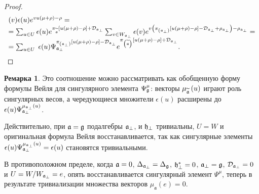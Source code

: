 \documentclass[12pt]{article}
\theoremstyle{definition}
\newtheorem{remark}{Ремарка}
\newcommand{\af}{\mathfrak{a}}
\newcommand{\aft}{\widetilde{\mathfrak{a}}}
\begin{document}
\begin{proof}
\begin{equation}
\begin{array}{l}
(v)\epsilon (u)e^{vu(\mu +\rho )-\rho }= \\
=\sum_{u\in U}\epsilon (u)e^{\pi _{\aft}\left[ u(\mu +\rho )-\rho \right]
+\mathcal{D}_{\frak{a}_{\perp }}}\sum_{v\in W_{\frak{a}_{\perp }}}\epsilon
(v)e^{v\left( \pi _{\left( \frak{a}_{\perp }\right) }\left[
u(\mu +\rho )-\rho \right] -\mathcal{D}_{\frak{a}_{\perp }}+\rho _{\frak{a}%
_{\perp }}\right) -\rho _{\frak{a}_{\perp }}}= \\
=\sum_{u\in U}\;\epsilon (u)\Psi _{\af_{\perp }}^{\pi
_{\left( \frak{a}_{\perp }\right) }\left[ u(\mu +\rho )-\rho
\right] -\mathcal{D}_{\frak{a}_{\perp }}}e^{\pi _{\left( \aft\right) }%
\left[ u(\mu +\rho )-\rho \right] +\mathcal{D}_{\frak{a}_{\perp }}}.
\end{array}
\label{singular main}
\end{equation}
\end{proof}

\bigskip

\begin{remark}
Это соотношение можно рассматривать как обобщенную форму формулы Вейля для сингулярного элемента $\Psi _{\frak{g}}^{\mu }$: векторы $\mu _{%
\widetilde{\mathfrak{a}}}\left( u\right) $ играют роль сингулярных весов, а чередующиеся множители  $\epsilon (u)$ расширены до $\epsilon
(u)\Psi _{\frak{a}_{\perp }}^{\mu _{\frak{a}_{\perp }}\left( u\right) }$.

Действительно, при  $\frak{a=g}$ подалгебры  $\frak{a}_{\perp }$, и $\frak{h}_{\perp }$ тривиальны, $U=W$ и оригинальная формула Вейля восстанавливается, так как сингулярные элементы $\epsilon (u)\Psi _{\frak{a}_{\perp %
}}^{\mu _{\frak{a}_{\perp }}\left( u\right) }=\epsilon (u)$ становятся  тривиальными.

В противоположном пределе, когда $\frak{a}=0$, $\Delta _{\frak{a}_{\perp }}=\Delta _{\frak{g}}$, $%
\frak{h}_{\perp }^{\ast }=0$, $\frak{a}_{\perp }=\frak{g}$, $\mathcal{D}_{%
\frak{a}_{\perp }}=0$ и $U=W/W_{\frak{a}_{\perp }}=e$, опять восстанавливается сингулярный элемент
 $\Psi ^{\mu }$, теперь в результате тривиализации множества векторов $\mu _{\af}\left( e\right) =0$.
\end{remark}
\end{document}
